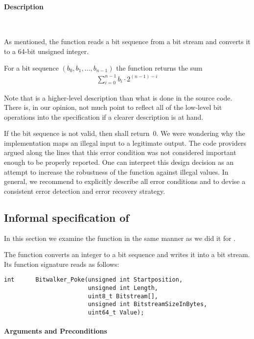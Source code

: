 \paragraph{Description}~

As mentioned, the function \peek reads a bit sequence from a bit stream
and converts it to a 64-bit unsigned integer.

For a bit sequence $(b_0, b_1,\ldots,b_{n - 1})$ the function \peek returns the sum
\begin{align}
\label{eq:peek-result}
    \sum_{i=0}^{n-1} b_i \cdot 2^{(n - 1) - i} 
\end{align}

Note that is a higher-level description than what is done in the source code.
There is, in our opinion, not much point to reflect all of the low-level bit operations
into the specification if a clearer description is at hand.

If the bit sequence is not valid, then \peek shall return~0.
We were wondering why the implementation maps an illegal input to a legitimate output.
The code providers argued along the lines that this error condition was not
considered important enough to be properly reported.
One can interpret this design decision as an attempt to increase the
robustness of the function against illegal values.
In general, we recommend to explicitly describe all error conditions
and to devise a consistent error detection and error recovery strategy.


\subsection{Informal specification of \poke}
\label{sec:informal-poke}

In this section we examine the function \poke
in the same manner as we did it for \peek.

The function \poke converts an integer to a bit sequence and writes it
into a bit stream.
Its function signature reads as follows:
\begin{lstlisting}[style = acsl-block]
int      Bitwalker_Poke(unsigned int Startposition,
                        unsigned int Length,
                        uint8_t Bitstream[],
                        unsigned int BitstreamSizeInBytes,
                        uint64_t Value);
\end{lstlisting}


\paragraph{Arguments and Preconditions}~

